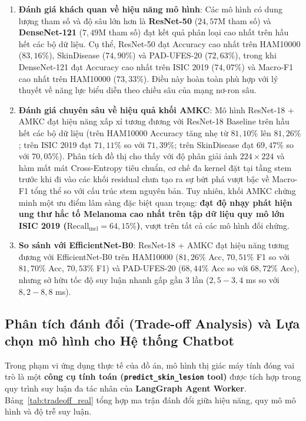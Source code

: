 \begin{enumerate}
  \item \textbf{Đánh giá khách quan về hiệu năng mô hình}:
  Các mô hình có dung lượng tham số và độ sâu lớn hơn là \textbf{ResNet-50} ($24{,}57$M tham số) và \textbf{DenseNet-121} ($7{,}49$M tham số) đạt kết quả phân loại cao nhất trên hầu hết các bộ dữ liệu. Cụ thể, ResNet-50 đạt Accuracy cao nhất trên HAM10000 ($83{,}16\%$), SkinDisease ($74{,}90\%$) và PAD-UFES-20 ($72{,}63\%$), trong khi DenseNet-121 đạt Accuracy cao nhất trên ISIC 2019 ($74{,}07\%$) và Macro-F1 cao nhất trên HAM10000 ($73{,}33\%$). Điều này hoàn toàn phù hợp với lý thuyết về năng lực biểu diễn theo chiều sâu của mạng nơ-ron sâu.

  \item \textbf{Đánh giá chuyên sâu về hiệu quả khối AMKC}:
  Mô hình ResNet-18 + AMKC đạt hiệu năng xấp xỉ tương đương với ResNet-18 Baseline trên hầu hết các bộ dữ liệu (trên HAM10000 Accuracy tăng nhẹ từ $81{,}10\%$ lên $81{,}26\%$; trên ISIC 2019 đạt $71{,}11\%$ so với $71{,}39\%$; trên SkinDisease đạt $69{,}47\%$ so với $70{,}05\%$). Phân tích đồ thị cho thấy với độ phân giải ảnh $224 \times 224$ và hàm mất mát Cross-Entropy tiêu chuẩn, cơ chế đa kernel đặt tại tầng stem trước khi đi vào các khối residual chưa tạo ra sự bứt phá vượt bậc về Macro-F1 tổng thể so với cấu trúc stem nguyên bản. Tuy nhiên, khối AMKC chứng minh một ưu điểm lâm sàng đặc biệt quan trọng: \textbf{đạt độ nhạy phát hiện ung thư hắc tố Melanoma cao nhất trên tập dữ liệu quy mô lớn ISIC 2019 ($\mathrm{Recall}_{\mathrm{mel}} = 64{,}15\%$)}, vượt trên tất cả các mô hình đối chứng.

  \item \textbf{So sánh với EfficientNet-B0}:
  ResNet-18 + AMKC đạt hiệu năng tương đương với EfficientNet-B0 trên HAM10000 ($81{,}26\%$ Acc, $70{,}51\%$ F1 so với $81{,}70\%$ Acc, $70{,}53\%$ F1) và PAD-UFES-20 ($68{,}44\%$ Acc so với $68{,}72\%$ Acc), nhưng sở hữu tốc độ suy luận nhanh gấp gần 3 lần ($2{,}5 - 3{,}4$ ms so với $8{,}2 - 8{,}8$ ms).
\end{enumerate}

\subsection{Phân tích đánh đổi (Trade-off Analysis) và Lựa chọn mô hình cho Hệ thống Chatbot}

Trong phạm vi ứng dụng thực tế của đồ án, mô hình thị giác máy tính đóng vai trò là một \textbf{công cụ tính toán (\texttt{predict\_skin\_lesion} tool)} được tích hợp trong quy trình suy luận đa tác nhân của \textbf{LangGraph Agent Worker}. Bảng~\ref{tab:tradeoff_real} tổng hợp ma trận đánh đổi giữa hiệu năng, quy mô mô hình và độ trễ suy luận.

